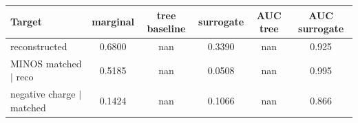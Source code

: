 \begin{tabular}{lccccc}
\toprule
Target & marginal & tree baseline & surrogate & AUC tree & AUC surrogate \\
\midrule
reconstructed & 0.6800 & nan & 0.3390 & nan & 0.925 \\
MINOS matched $\mid$ reco & 0.5185 & nan & 0.0508 & nan & 0.995 \\
negative charge $\mid$ matched & 0.1424 & nan & 0.1066 & nan & 0.866 \\
\bottomrule
\end{tabular}
